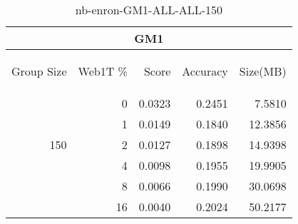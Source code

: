 \begin{center}
\begin{table}[htbp]
\begin{tabular}{ | r | r | r | r | r |}
\hline
\multicolumn{5}{|c|}{GM1}\\
\hline
\begin{sideways}Group Size\end{sideways} & \begin{sideways}Web1T \%\end{sideways} & \begin{sideways}Score\end{sideways} & \begin{sideways}Accuracy\end{sideways} & \begin{sideways}Size(MB)\end{sideways}\\
\hline
\multirow{5}{*}{150}
 & 0 & 0.0323 & 0.2451 & 7.5810\\ \cline{2-5}
 & 1 & 0.0149 & 0.1840 & 12.3856\\ \cline{2-5}
 & 2 & 0.0127 & 0.1898 & 14.9398\\ \cline{2-5}
 & 4 & 0.0098 & 0.1955 & 19.9905\\ \cline{2-5}
 & 8 & 0.0066 & 0.1990 & 30.0698\\ \cline{2-5}
 & 16 & 0.0040 & 0.2024 & 50.2177\\ \cline{2-5}
\hline
\end{tabular}
\caption{nb-enron-GM1-ALL-ALL-150}
\label{table:nb-enron-GM1-ALL-ALL-150}
\end{table}
\end{center}

